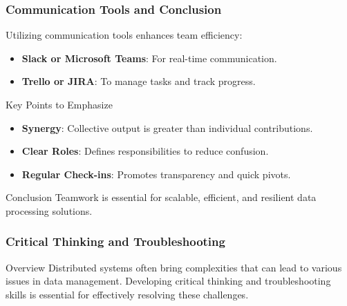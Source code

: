 \documentclass[aspectratio=169]{beamer}
\begin{document}
\begin{frame}[fragile]
    \frametitle{Communication Tools and Conclusion}
    Utilizing communication tools enhances team efficiency:
    \begin{itemize}
        \item \textbf{Slack or Microsoft Teams}: For real-time communication.
        \item \textbf{Trello or JIRA}: To manage tasks and track progress.
    \end{itemize}

    \begin{block}{Key Points to Emphasize}
        \begin{itemize}
            \item \textbf{Synergy}: Collective output is greater than individual contributions.
            \item \textbf{Clear Roles}: Defines responsibilities to reduce confusion.
            \item \textbf{Regular Check-ins}: Promotes transparency and quick pivots.
        \end{itemize}
    \end{block}

    \begin{block}{Conclusion}
        Teamwork is essential for scalable, efficient, and resilient data processing solutions.
    \end{block}
\end{frame}

\begin{frame}[fragile]
  \frametitle{Critical Thinking and Troubleshooting}
  \begin{block}{Overview}
    Distributed systems often bring complexities that can lead to various issues in data management. Developing critical thinking and troubleshooting skills is essential for effectively resolving these challenges.
  \end{block}
\end{frame}
\end{document}
